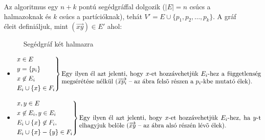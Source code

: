 Az algoritmus egy $n+k$ pontú segédgráffal dolgozik ($|E|=n$ csúcs a halmazoknak
és $k$ csúcs a partícióknak), tehát $V' = E \cup \{p_1, p_2, \ldots, p_k\}$. A
gráf éleit definiáljuk, mint $(\overrightarrow{xy}) \in E'$ ahol:

\begin{figure}[htbp]
\caption{Segédgráf két halmazra}
\label{fig:MPP_graf}
\centering {}
\end{figure}


\begin{itemize}
  \item  $\begin{rcases}
  x \in E \\
  y = \{ p_i \}  \\
  x \not \in E_i\\
  E_i \cup  \{x\}  \in  F_i \end{rcases}
  \parbox[t]{11cm}{Egy ilyen él azt jelenti, hogy $x$-et hozzávehetjük $E_i$-hez
   a függetlenség megsérétése nélkül ($\overrightarrow{xp_i}$ -- az ábra felsõ
  részen a $p_i$-kbe mutató élek).}$
  \item $\begin{rcases}
  x,y \in E \\
  x \not\in E_i, y \in E_i\\
   E_i \cup \{x\} \not\in F_i,\\
   E_i \cup \{x\} - \{y\} \in F_i
  \end{rcases} \parbox[t]{10cm}{Egy ilyen él azt jelenti, hogy $x$-et
  hozzávehetjük $E_i$-hez, ha $y$-t elhagyjuk belöle ($\overrightarrow{xy}$ --
  az ábra alsó részén lévõ élek).}$
\end{itemize}

